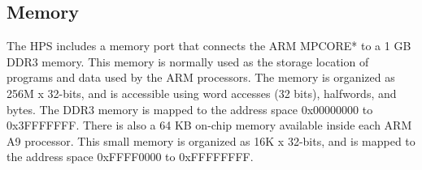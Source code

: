 \subsection{Memory}
\label{sec:ddr3}
The HPS includes a memory port that connects the ARM MPCORE* to a 1 GB DDR3 memory.
This memory is normally used as the storage location of programs and data used by the ARM
processors. The memory is organized as 256M {\sf x} 32-bits, and is accessible using word
accesses (32 bits), halfwords, and bytes. The DDR3 memory is mapped to the address space
{\sf 0x00000000} to {\sf 0x3FFFFFFF}. There is also a 64 KB on-chip memory available inside 
each ARM A9 processor. This small memory is organized as 16K {\sf x} 32-bits, and is mapped 
to the address space {\sf 0xFFFF0000} to {\sf 0xFFFFFFFF}.


